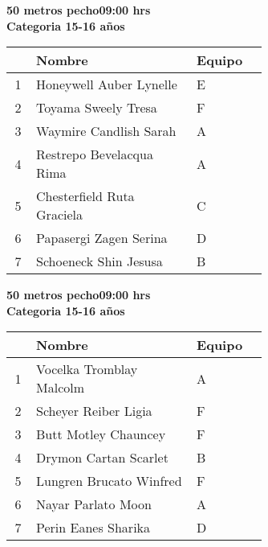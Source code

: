 \begin{minipage}{0.95\linewidth}\vspace{0.5cm} 
\begin{flushleft}
\textbf{
\hspace{-0.15cm}50 metros pecho\hspace{1.5cm}09:00 hrs \\Categoria 15-16 años}\vspace{-0.2cm} 
\end{flushleft}
\begin{tabular}{cp{0.63\linewidth}l}
\hline
& \textbf{Nombre} & \textbf{Equipo} \\ \hline
1 & Honeywell Auber Lynelle & E \\ 
2 & Toyama Sweely Tresa & F \\ 
3 & Waymire Candlish Sarah & A \\ 
4 & Restrepo Bevelacqua Rima & A \\ 
5 & Chesterfield Ruta Graciela & C \\ 
6 & Papasergi Zagen Serina & D \\ 
7 & Schoeneck Shin Jesusa & B \\ 
\end{tabular}
\end{minipage}
\begin{minipage}{0.95\linewidth}\vspace{0.5cm} 
\begin{flushleft}
\textbf{
\hspace{-0.15cm}50 metros pecho\hspace{1.5cm}09:00 hrs \\Categoria 15-16 años}\vspace{-0.2cm} 
\end{flushleft}
\begin{tabular}{cp{0.63\linewidth}l}
\hline
& \textbf{Nombre} & \textbf{Equipo} \\ \hline
1 & Vocelka Tromblay Malcolm & A \\ 
2 & Scheyer Reiber Ligia & F \\ 
3 & Butt Motley Chauncey & F \\ 
4 & Drymon Cartan Scarlet & B \\ 
5 & Lungren Brucato Winfred & F \\ 
6 & Nayar Parlato Moon & A \\ 
7 & Perin Eanes Sharika & D \\ 
\end{tabular}
\end{minipage}
